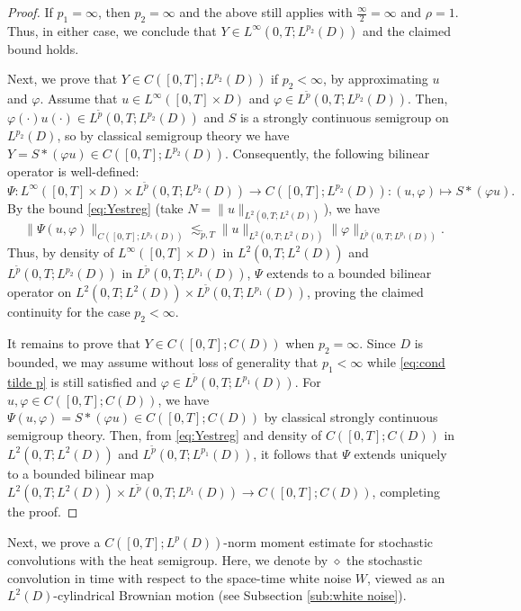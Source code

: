 \documentclass{amsart}
\theoremstyle{plain}
\theoremstyle{remark}
\theoremstyle{plain}
\numberwithin{equation}{section}
\newcommand{\col}{\colon}
\begin{document}
\begin{proof}
If $p_1=\infty$, then $p_2=\infty$ and the above still applies with $\frac{\infty}{2}=\infty$ and $\rho=1$. 
Thus, in either case, we conclude that $Y\in L^\infty(0,T;L^{p_2}(D))$ and the claimed bound holds. 
 
Next, we prove that $Y\in C([0,T];L^{p_2}(D))$ if $p_2<\infty$, by approximating $u$ and $\varphi$. 
Assume that $u\in L^\infty([0,T]\times D)$ and $\varphi\in L^{\tilde p}(0,T;L^{p_2}(D))$. 
Then, $\varphi(\cdot)u(\cdot)\in L^{\tilde p}(0,T;L^{p_2}(D))$ and $S$ is a strongly continuous semigroup on $L^{p_2}(D)$, so by classical semigroup theory we have $Y=S*(\varphi u)\in C([0,T];L^{p_2}(D))$. Consequently, the following bilinear operator is well-defined:
\[
\Psi \col L^\infty([0,T]\times D)\times L^{\tilde p}(0,T;L^{p_2}(D))\to C([0,T];L^{p_2}(D))\col (u,\varphi)\mapsto S*(\varphi u).
\]
By the bound \eqref{eq:Yestreg} (take $N=\|u\|_{L^2(0,T;L^2(D))}$),  we have 
\begin{equation}\label{eq:skel conv cont}
\|\Psi (u,\varphi)\|_{C([0,T];L^{p_2}(D))}\lesssim_{\tilde p,T} \|u\|_{L^2(0,T;L^2(D))}\|\varphi\|_{L^{\tilde p}(0,T;L^{p_1}(D))}.
\end{equation}
Thus, by density of  $L^\infty([0,T]\times D)$ in $L^2(0,T;L^2(D))$ and $L^{\tilde p}(0,T;L^{p_2}(D))$ in $L^{\tilde p}(0,T;L^{p_1}(D))$, $\Psi$ extends to a bounded bilinear operator on $L^2(0,T;L^2(D))\times L^{\tilde p}(0,T;L^{p_1}(D))$, proving the claimed continuity for the case $p_2<\infty$. 

It remains to prove that $Y \in C([0,T]; C(D))$ when $p_2 = \infty$. Since $D$ is  bounded, we may assume without loss of generality that $p_1 < \infty$ while \eqref{eq:cond tilde p} is still satisfied and $\varphi\in L^{\tilde p}(0,T;L^{p_1}(D))$. 
For $u,\varphi \in C([0,T]; C(D))$, we have $\Psi(u,\varphi)= S*(\varphi u) \in C([0,T];C(D))$ by classical strongly continuous semigroup theory. 
Then, from  \eqref{eq:Yestreg} and density of  $C([0,T];C(D))$  in $L^2(0,T; L^2(D))$ and $L^{\tilde p}(0,T; L^{p_1}(D))$, it follows that $\Psi$ extends uniquely to a bounded bilinear map $L^2(0,T;L^2(D))\times L^{\tilde p}(0,T;L^{p_1}(D))\to C([0,T]; C(D))$, completing the proof. 
\end{proof} 


Next, we prove a $C([0,T];L^p(D))$-norm moment estimate for stochastic convolutions with the heat semigroup. Here, we denote by $\diamond$ the stochastic convolution in time with respect to the space-time white noise $W$, viewed as an $L^2(D)$-cylindrical Brownian motion (see Subsection \ref{sub:white noise}). 
\end{document}
